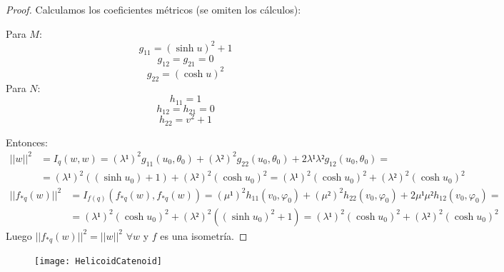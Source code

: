 \documentclass[twoside]{report}
\begin{document}
\begin{proof}
Calculamos los coeficientes métricos (se omiten los cálculos):

Para $M$:
\[ g_{11} = (\sinh u)^2+1 \]
\[ g_{12} = g_{21} = 0 \]
\[ g_{22} = (\cosh u)^2 \]
Para $N$:
\[ h_{11} = 1 \]
\[ h_{12} = h_{21} = 0 \]
\[ h_{22} = v^2+1 \]

Entonces:
\begin{align*}
	||w||^2 & = I_q(w,w) = (λ¹)^2g_{11}(u_0,θ_0)+(λ²)^2g_{22}(u_0,θ_0)+2λ¹λ²g_{12}(u_0,θ_0) = \\
	& = (λ¹)^2 ((\sinh u_0)+1) + (λ²)^2(\cosh u_0)^2 = (λ¹)^2 (\cosh u_0)^2 + (λ²)^2(\cosh u_0)^2
\end{align*}
\begin{align*}
	||f_{*q}(w)||^2 & = I_{f(q)} (f_{*q}(w),f_{*q}(w)) = (μ¹)^2 h_{11}(v_0,φ_0)+(μ²)^2h_{22}(v_0,φ_0) + 2μ¹μ² h_{12}(v_0,φ_0) = \\
	& = (λ¹)^2(\cosh u_0)^2 + (λ²)^2((\sinh u_0)^2+1) = (λ¹)^2 (\cosh u_0)^2 + (λ²)^2(\cosh u_0)^2
\end{align*}
Luego $||f_{*q}(w)||^2 = ||w||^2$ $\forall w$ y $f$ es una isometría.
\end{proof}

\begin{figure}[!ht]
  \centering
    \texttt{[image: HelicoidCatenoid]}
\end{figure}\
\end{document}
